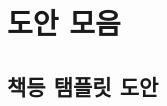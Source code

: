 \documentclass[12pt, a4paper, oneside]{book}
\begin{document}
	\newpage
	\chapter{도안 모음}



	\section{책등 탬플릿 도안}




	
\end{document}
